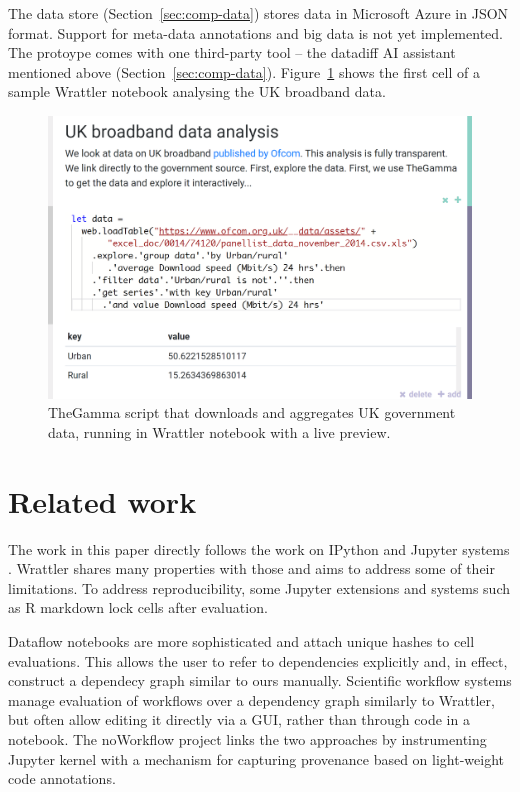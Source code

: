 \documentclass[sigplan]{acmart}\settopmatter{printfolios=true,printccs=false,printacmref=false}
\begin{document}
The data store (Section~\ref{sec:comp-data}) 
stores data in Microsoft Azure in JSON format. Support for meta-data annotations and big data
is not yet implemented. The protoype comes with one third-party tool -- the datadiff AI 
assistant mentioned above (Section~\ref{sec:comp-data}). Figure~\ref{fig:proto} shows the 
first cell of a sample Wrattler notebook analysing the UK broadband data.

\begin{figure}
\includegraphics[scale=0.15]{screen.png}
\caption{\small{TheGamma script that downloads and aggregates UK government data, running in 
  Wrattler notebook with a live preview.}}
\label{fig:proto}
\end{figure}

\section{Related work}

The work in this paper directly follows the work on IPython and Jupyter systems
\cite{ipython,jupyter}. Wrattler shares many properties with those and aims to address some
of their limitations. To address reproducibility, some Jupyter extensions and systems such
as R markdown \cite{rmarkdown} lock cells after evaluation. 

Dataflow notebooks \cite{dataflow} are more sophisticated and attach unique hashes to cell 
evaluations. This allows the user to refer to dependencies explicitly and, in effect, construct
a dependecy graph similar to ours manually.
Scientific workflow systems \cite{taverna,kepler} manage evaluation of workflows over a 
dependency graph similarly to Wrattler, but often allow editing it directly via a GUI, rather
than through code in a notebook.
The noWorkflow project \cite{noworkflow} links the two approaches by instrumenting Jupyter 
kernel with a mechanism for capturing provenance based on light-weight code annotations.
\end{document}
